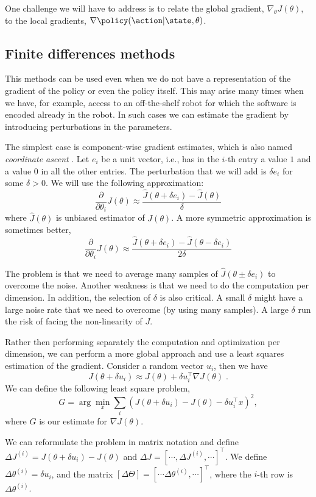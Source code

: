 One challenge we will have to address is to relate the global gradient, $\nabla_\theta J(\theta)$, to the local gradients, $\nabla \policy(\action|\state,\theta)$.

\subsection{Finite differences methods}

This methods can be used even when we do not have a representation
of the gradient of the policy or even the policy itself. This may
arise many times when we have, for example, access to an
off-the-shelf robot for which the software is encoded already in the
robot. In such cases we can estimate the gradient by introducing
perturbations in the parameters.

The simplest case is component-wise gradient estimates, which is also named \emph{coordinate ascent} . Let $e_i$ be
a unit vector, i.e., has in the $i$-th entry a value $1$ and a value
$0$ in all the other entries. The perturbation that we will add is
$\delta e_i$ for some $\delta >0$. We will use the following
approximation:
\[
\frac{\partial}{\partial \theta_i}J(\theta)\approx
\frac{\hat{J}(\theta+\delta e_i)-\hat{J}(\theta)}{\delta}
\]
where $\hat{J}(\theta)$ is unbiased estimator of $J(\theta)$. A more
symmetric approximation is sometimes better,
\[
\frac{\partial}{\partial \theta_i}J(\theta)\approx
\frac{\hat{J}(\theta+\delta e_i)-\hat{J}(\theta-\delta e_i
)}{2\delta}
\]

The problem is that we need to average many samples of
$\hat{J}(\theta\pm\delta e_i)$ to overcome the noise. Another
weakness is that we need to do the computation per dimension. In
addition, the selection of $\delta$ is also critical. A small
$\delta$ might have a large noise rate that we need to overcome (by
using many samples). A large $\delta$ run the risk of facing the
non-linearity of $J$.

Rather then performing separately the computation and optimization per dimension, we can perform a more global approach and use a least squares estimation of the gradient.
Consider a random vector $u_i$, then we have
\[
J(\theta+\delta u_i)\approx J(\theta)+\delta u_i^\top \nabla
J(\theta) \;.
\]
We can define the following least square problem,
\[
G= \arg\min_x \sum_i (J(\theta+\delta u_i)- J(\theta)-\delta
u_i^\top x)^2,
\]
where $G$ is our estimate for $\nabla J(\theta)$.

We can reformulate the problem in matrix notation and define $\Delta
J^{(i)}=J(\theta+\delta u_i)- J(\theta)$ and $\Delta J= [\cdots ,
\Delta J^{(i)}, \cdots]^\top$. We define $\Delta \theta^{(i)}=\delta
u_i$, and the matrix $[\Delta\Theta]=[\cdots
\Delta\theta^{(i)},\cdots]^\top$, where the $i$-th row is
$\Delta\theta^{(i)}$.

